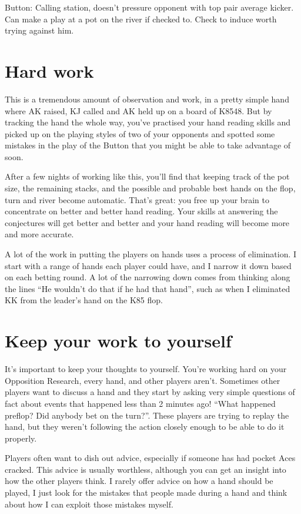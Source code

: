 Button: Calling station, doesn't pressure opponent with top pair
average kicker. Can make a play at a pot on the river if checked to. 
Check to induce worth trying against him.

\section{Hard work}

This is a tremendous amount of observation and work, in a pretty simple
hand where AK raised, KJ called and AK held up on a board of K8548. But
by tracking the hand the whole way, you've practised your hand reading skills
and picked up on the playing styles of two of your opponents and spotted
some mistakes in the play of the Button that you might be able to
take advantage of soon.

After a few nights of working like this, you'll find that keeping track
of the pot size, the remaining stacks, and the possible and probable
best hands on the flop, turn and river become automatic. That's great: you
free up your brain to concentrate on better and better hand reading. Your
skills at answering the conjectures will get better and better and your
hand reading will become more and more accurate.

A lot of the work in putting the players on hands uses a process
of elimination. I start with a range of hands each player could have,
and I narrow it down based on each betting round. A lot of the narrowing
down comes from thinking along the lines ``He wouldn't do that if he
had that hand'', such as when I eliminated KK from the leader's hand
on the K85 flop.

\section{Keep your work to yourself}

It's important to keep your thoughts to yourself. You're working
hard on your Opposition Research, every hand, and other players aren't.
Sometimes other players want to discuss a hand and they start by asking
very simple questions of fact about events that happened less than
2 minutes ago! ``What happened preflop? Did anybody bet on the turn?''.
These players are trying to replay the hand, but they weren't following
the action closely enough to be able to do it properly.

Players often want to dish out advice, especially if someone has had
pocket Aces cracked. This advice is usually worthless, although you
can get an insight into how the other players think. I rarely offer
advice on how a hand should be played, I just look for the mistakes
that people made during a hand and think about how I can exploit
those mistakes myself.

